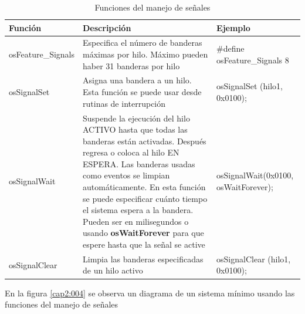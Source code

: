 \documentclass[12pt, twoside]{report}
\begin{document}
\begin{table}[H]
	\begin{tabularx}{15cm}{|X|X|X|}
		\hline
		\rowcolor[gray]{0.8}Función & Descripción & Ejemplo\\
		\hline
		\rowcolor[gray]{1}osFeature\_Signals  & Especifica el número de banderas máximas por hilo. Máximo pueden haber 31 banderas por hilo & 
		\#define osFeature\_Signals   8\\
		\hline
		\rowcolor[gray]{0.8}osSignalSet & Asigna una bandera a un hilo. Esta función se puede usar desde rutinas de interrupción & osSignalSet (hilo1, 0x0100); \\
		\hline
		\rowcolor[gray]{1}osSignalWait & Suspende la ejecución del hilo ACTIVO hasta que todas las banderas están activadas. Después regresa o coloca al hilo EN ESPERA. Las banderas usadas como eventos se limpian automáticamente. En esta función se puede especificar cuánto tiempo el sistema espera a la bandera. Pueden ser en milisegundos o usando \textbf{osWaitForever} para que espere hasta que la señal se active & osSignalWait(0x0100, osWaitForever); \\
		\hline
		\rowcolor[gray]{0.8}osSignalClear & Limpia las banderas especificadas de un hilo activo &  osSignalClear (hilo1, 0x0100);\\
		\hline
	\end{tabularx}
	\caption{Funciones del manejo de señales}
	\label{tabla2:002}
\end{table}

En la figura \ref{cap2:004} se observa un diagrama de un sistema mínimo usando las funciones del manejo de señales
\end{document}
